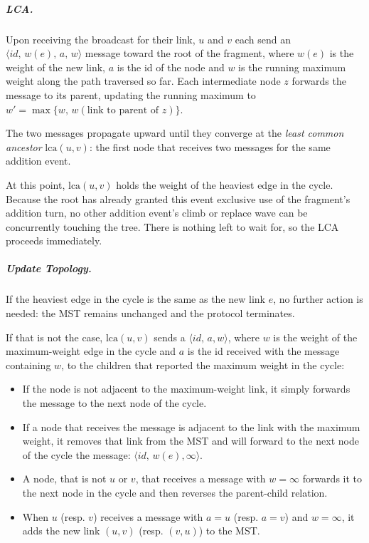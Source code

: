 \subparagraph{LCA.}
Upon receiving the  broadcast for their link, $u$ and $v$ each send an
$\langle id,\, w(e),\, a,\, w \rangle$ message toward the root of the
fragment, where $w(e)$ is the weight of the new link, $a$ is the id of the node and $w$ is
the running maximum weight along the path traversed so far. Each intermediate node $z$
forwards the message to its parent, updating the running maximum to $w' = \max\{w,\,
w(\text{link to parent of } z)\}$.

The two messages propagate upward until they converge at the \emph{least common ancestor}
$\mathrm{lca}(u,v)$: the first node that receives two  messages for the same
addition event.

At this point, $\mathrm{lca}(u,v)$ holds the weight of the heaviest edge in the cycle. 
Because the root has already granted this event exclusive use of the fragment's addition 
turn, no other addition event's climb or replace wave can be concurrently touching the
tree. There is nothing left to wait for, so the LCA proceeds immediately.

\subparagraph{Update Topology.}

If the heaviest edge in the cycle is the same as the new link $e$, no further action is
needed: the MST remains unchanged and the protocol terminates.

If that is not the case, $\mathrm{lca}(u,v)$ sends a $\langle id,\, a, w \rangle$, 
where $w$ is the weight of the maximum-weight edge in the cycle and $a$ is the id received with
the message containing $w$, to the children that reported the maximum weight in the cycle:

\begin{itemize}
  \item If the node is not adjacent to the maximum-weight link, it simply forwards the message
        to the next node of the cycle.
  \item If a node that receives the message is adjacent to the link with
        the maximum weight, it removes that link from the MST and will forward 
        to the next node of the cycle the message:
        $\langle id,\, w(e), \infty \rangle$.
  \item A node, that is not $u$ or $v$, that receives a  message with $w = \infty$ 
        forwards it to the next node in the cycle and then reverses the parent-child relation.
  \item When $u$ (resp. $v$) receives a  message with $a = u$ (resp. $a = v$) and 
        $w = \infty$, it adds the new link $(u,v)$ (resp. $(v,u)$) to the MST.
\end{itemize}

